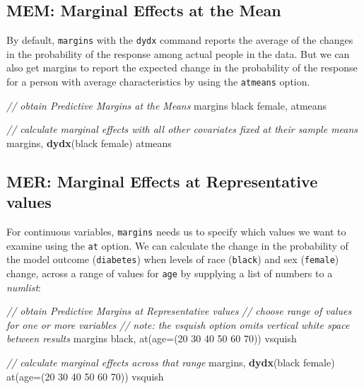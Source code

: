 \documentclass[
]{book}
\newenvironment{Shaded}{\begin{snugshade}}{\end{snugshade}}
\newcommand{\BaseNTok}[1]{\textcolor[rgb]{0.00,0.00,0.81}{#1}}
\newcommand{\CommentTok}[1]{\textcolor[rgb]{0.56,0.35,0.01}{\textit{#1}}}
\newcommand{\FunctionTok}[1]{\textcolor[rgb]{0.00,0.00,0.00}{#1}}
\newcommand{\KeywordTok}[1]{\textcolor[rgb]{0.13,0.29,0.53}{\textbf{#1}}}
\newcommand{\NormalTok}[1]{#1}
\begin{document}
\hypertarget{mem-marginal-effects-at-the-mean}{%
\subsection{MEM: Marginal Effects at the Mean}\label{mem-marginal-effects-at-the-mean}}

By default, \texttt{margins} with the \texttt{dydx} command reports the average of the changes in the probability of the response among actual people in the data. But we can also get margins to report the expected change in the probability of the response for a person with average characteristics by using the \texttt{atmeans} option.

\begin{Shaded}
\begin{Highlighting}[]
\CommentTok{// obtain Predictive Margins at the Means}
\NormalTok{margins }\BaseNTok{black}\NormalTok{ female, atmeans}

\CommentTok{// calculate marginal effects with all other covariates fixed at their sample means }
\NormalTok{margins, }\KeywordTok{dydx}\NormalTok{(}\BaseNTok{black}\NormalTok{ female) atmeans}
\end{Highlighting}
\end{Shaded}

\hypertarget{mer-marginal-effects-at-representative-values}{%
\subsection{MER: Marginal Effects at Representative values}\label{mer-marginal-effects-at-representative-values}}

For continuous variables, \texttt{margins} needs us to specify which values we want to examine using the \texttt{at} option. We can calculate the change in the probability of the model outcome (\texttt{diabetes}) when levels of race (\texttt{black}) and sex (\texttt{female}) change, across a range of values for \texttt{age} by supplying a list of numbers to a \emph{numlist}:

\begin{Shaded}
\begin{Highlighting}[]
\CommentTok{// obtain Predictive Margins at Representative values}
\CommentTok{// choose range of values for one or more variables}
\CommentTok{// note: the \textasciigrave{}vsquish\textasciigrave{} option omits vertical white space between results}
\NormalTok{margins }\BaseNTok{black}\NormalTok{, }\FunctionTok{at}\NormalTok{(age=(20 30 40 50 60 70)) vsquish }

\CommentTok{// calculate marginal effects across that range }
\NormalTok{margins, }\KeywordTok{dydx}\NormalTok{(}\BaseNTok{black}\NormalTok{ female) }\FunctionTok{at}\NormalTok{(age=(20 30 40 50 60 70)) vsquish }
\end{Highlighting}
\end{Shaded}
\end{document}
